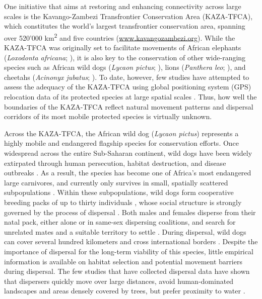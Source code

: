 \documentclass[abstract=on,10pt,a4paper,bibliography=totocnumbered]{article}
\begin{document}
One initiative that aims at restoring and enhancing connectivity across large
scales is the Kavango-Zambezi Transfrontier Conservation Area (KAZA-TFCA), which
constitutes the world's largest transfrontier conservation area, spanning over
520'000 km\textsuperscript{2} and five countries (\url{www.kavangozambezi.org}).
While the KAZA-TFCA was originally set to facilitate movements of African
elephants (\textit{Loxodonta africana}; \citealp{Tshipa.2017}), it is also key
to the conservation of other wide-ranging species such as African wild dogs
(\textit{Lycaon pictus}; \citealp{Woodroffe.2012, Cozzi.2020}), lions
(\textit{Panthera leo}; \citealp{Elliot.2014, Cushman.2018}), and cheetahs
(\textit{Acinonyx jubatus}; \citealp{Weise.2017}). To date, however, few studies
have attempted to assess the adequacy of the KAZA-TFCA using global positioning
system (GPS) relocation data of its protected species at large spatial scales
\citep{Elliot.2014, Tshipa.2017, Brennan.2020}. Thus, how well the boundaries of
the KAZA-TFCA reflect natural movement patterns and dispersal corridors of its
most mobile protected species is virtually unknown.

Across the KAZA-TFCA, the African wild dog (\textit{Lycaon pictus}) represents a
highly mobile and endangered flagship species for conservation efforts. Once
widespread across the entire Sub-Saharan continent, wild dogs have been widely
extirpated through human persecution, habitat destruction, and disease outbreaks
\citep{Woodroffe.2012}. As a result, the species has become one of Africa's most
endangered large carnivores, and currently only survives in small, spatially
scattered subpopulations \citep{Woodroffe.2012}. Within these subpopulations,
wild dogs form cooperative breeding packs of up to thirty individuals
\citep{Creel.2002}, whose social structure is strongly governed by the process
of dispersal \citep{McNutt.1996, Behr.2020}. Both males and females disperse
from their natal pack, either alone or in same-sex dispersing coalitions, and
search for unrelated mates and a suitable territory to settle
\citep{McNutt.1996, Cozzi.2020, Behr.2020}. During dispersal, wild dogs can
cover several hundred kilometers and cross international borders
\citep{Masenga.2016, Woodroffe.2019, Cozzi.2020}. Despite the importance of
dispersal for the long-term viability of this species, little empirical
information is available on habitat selection and potential movement barriers
during dispersal. The few studies that have collected dispersal data have shown
that dispersers quickly move over large distances, avoid human-dominated
landscapes and areas densely covered by trees, but prefer proximity to water
\citep{Masenga.2016, Woodroffe.2019, Oneill.2020, Cozzi.2020}.
\end{document}

